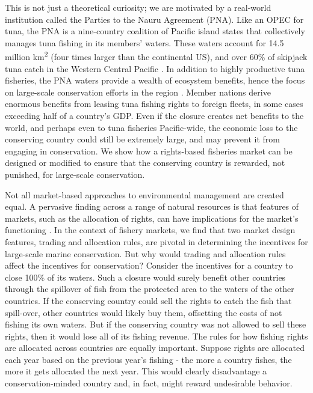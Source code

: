 \documentclass[12pt]{article}
\begin{document}
This is not just a theoretical curiosity; we are motivated by a real-world institution called the Parties to the Nauru Agreement (PNA). Like an OPEC for tuna, the PNA is a nine-country coalition of Pacific island states that collectively manages tuna fishing in its members' waters\cite{havice_2013,aqorau_2018}. These waters account for 14.5 million km\textsuperscript{2} (four times larger than the continental US), and over 60\% of skipjack tuna catch in the Western Central Pacific \cite{havice_2013}. In addition to highly productive tuna fisheries, the PNA waters provide a wealth of ecosystem benefits, hence the focus on large-scale conservation efforts in the region \cite{mcleod_2019}. Member nations derive enormous benefits from leasing tuna fishing rights to foreign fleets, in some cases exceeding half of a country's GDP. Even if the closure creates net benefits to the world, and perhaps even to tuna fisheries Pacific-wide, the economic loss to the conserving country could still be extremely large, and may prevent it from engaging in conservation. We show how a rights-based fisheries market can be designed or modified  to ensure that the conserving country is rewarded, not punished, for large-scale conservation.

Not all market-based approaches to environmental management are created equal. A pervasive finding across a range of natural resources is that features of markets, such as the allocation of rights, can have implications for the market's functioning \cite{libecap_1989}. In the context of fishery markets, we find that two market design features, trading and allocation rules, are pivotal in determining the incentives for large-scale marine conservation. But why would trading and allocation rules affect the incentives for conservation? Consider the incentives for a country to close 100\% of its waters. Such a closure would surely benefit other countries through the spillover of fish from the protected area to the waters of the other countries. If the conserving country could sell the rights to catch the fish that spill-over, other countries would likely buy them, offsetting the costs of not fishing its own waters. But if the conserving country was not allowed to sell these rights, then it would lose all of its fishing revenue. The rules for how fishing rights are allocated across countries are equally important. Suppose rights are allocated each year based on the previous year's fishing - the more a country fishes, the more it gets allocated the next year. This would clearly disadvantage a conservation-minded country and, in fact, might reward undesirable behavior.
\end{document}
